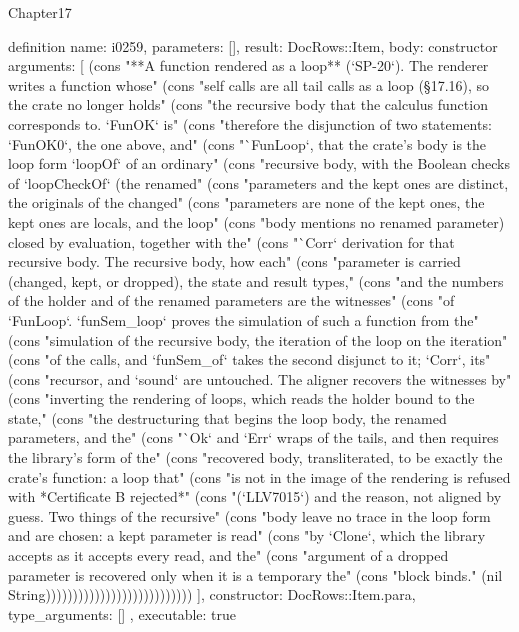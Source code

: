 \begin{lexlean}{Chapter17}
\begin{semanticmodule}
definition{
  name: i0259,
  parameters: [],
  result: DocRows::Item,
  body: constructor{
    arguments: [
      (cons "**A function rendered as a loop** (`SP-20`). The renderer writes a function whose" (cons "self calls are all tail calls as a loop (§17.16), so the crate no longer holds" (cons "the recursive body that the calculus function corresponds to. `FunOK` is" (cons "therefore the disjunction of two statements: `FunOK0`, the one above, and" (cons "`FunLoop`, that the crate's body is the loop form `loopOf` of an ordinary" (cons "recursive body, with the Boolean checks of `loopCheckOf` (the renamed" (cons "parameters and the kept ones are distinct, the originals of the changed" (cons "parameters are none of the kept ones, the kept ones are locals, and the loop" (cons "body mentions no renamed parameter) closed by evaluation, together with the" (cons "`Corr` derivation for that recursive body. The recursive body, how each" (cons "parameter is carried (changed, kept, or dropped), the state and result types," (cons "and the numbers of the holder and of the renamed parameters are the witnesses" (cons "of `FunLoop`. `funSem_loop` proves the simulation of such a function from the" (cons "simulation of the recursive body, the iteration of the loop on the iteration" (cons "of the calls, and `funSem_of` takes the second disjunct to it; `Corr`, its" (cons "recursor, and `sound` are untouched. The aligner recovers the witnesses by" (cons "inverting the rendering of loops, which reads the holder bound to the state," (cons "the destructuring that begins the loop body, the renamed parameters, and the" (cons "`Ok` and `Err` wraps of the tails, and then requires the library's form of the" (cons "recovered body, transliterated, to be exactly the crate's function: a loop that" (cons "is not in the image of the rendering is refused with *Certificate B rejected*" (cons "(`LLV7015`) and the reason, not aligned by guess. Two things of the recursive" (cons "body leave no trace in the loop form and are chosen: a kept parameter is read" (cons "by `Clone`, which the library accepts as it accepts every read, and the" (cons "argument of a dropped parameter is recovered only when it is a temporary the" (cons "block binds." (nil String)))))))))))))))))))))))))))
    ],
    constructor: DocRows::Item.para,
    type_arguments: []
  },
  executable: true
}


\end{semanticmodule}
\end{lexlean}
